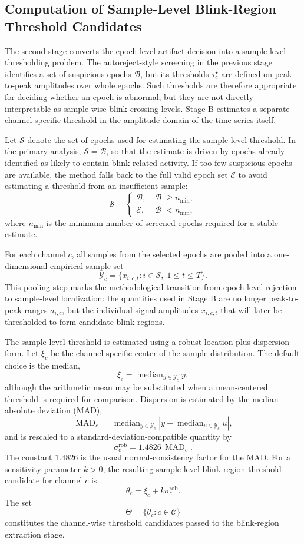 \subsection{Computation of Sample-Level Blink-Region Threshold Candidates}

The second stage converts the epoch-level artifact decision into a
sample-level thresholding problem. The autoreject-style screening in the
previous stage identifies a set of suspicious epochs \(\mathcal{B}\), but its
thresholds \(\tau_c^\star\) are defined on peak-to-peak amplitudes over whole
epochs. Such thresholds are therefore appropriate for deciding whether an epoch
is abnormal, but they are not directly interpretable as sample-wise blink
crossing levels. Stage B estimates a separate channel-specific threshold in
the amplitude domain of the time series itself.

Let \(\mathcal{S}\) denote the set of epochs used for estimating the
sample-level threshold. In the primary analysis,
\(\mathcal{S}=\mathcal{B}\), so that the estimate is driven by epochs already
identified as likely to contain blink-related activity. If too few suspicious
epochs are available, the method falls back to the full valid epoch set
\(\mathcal{E}\) to avoid estimating a threshold from an insufficient sample:
\[
\mathcal{S}
=
\begin{cases}
\mathcal{B}, & |\mathcal{B}| \geq n_{\min},\\
\mathcal{E}, & |\mathcal{B}| < n_{\min},
\end{cases}
\]
where \(n_{\min}\) is the minimum number of screened epochs required for a
stable estimate.

For each channel \(c\), all samples from the selected epochs are pooled into a
one-dimensional empirical sample set
\[
\mathcal{Y}_c
= \{x_{i,c,t}: i \in \mathcal{S},\; 1 \leq t \leq T\}.
\]
This pooling step marks the methodological transition from epoch-level
rejection to sample-level localization: the quantities used in Stage B are no
longer peak-to-peak ranges \(a_{i,c}\), but the individual signal amplitudes
\(x_{i,c,t}\) that will later be thresholded to form candidate blink regions.

The sample-level threshold is estimated using a robust location-plus-dispersion
form. Let \(\xi_c\) be the channel-specific center of the sample distribution.
The default choice is the median,
\[
\xi_c = \operatorname{median}_{y \in \mathcal{Y}_c} y,
\]
although the arithmetic mean may be substituted when a mean-centered threshold
is required for comparison. Dispersion is estimated by the median absolute
deviation (MAD),
\[
\operatorname{MAD}_c
= \operatorname{median}_{y \in \mathcal{Y}_c}
\left|y-\operatorname{median}_{u \in \mathcal{Y}_c}u\right|,
\]
and is rescaled to a standard-deviation-compatible quantity by
\[
\sigma^{\mathrm{rob}}_c = 1.4826\,\operatorname{MAD}_c .
\]
The constant \(1.4826\) is the usual normal-consistency factor for the MAD. For
a sensitivity parameter \(k>0\), the resulting sample-level blink-region
threshold candidate for channel \(c\) is
\[
\theta_c = \xi_c + k\sigma^{\mathrm{rob}}_c .
\]
The set
\[
\Theta = \{\theta_c: c \in \mathcal{C}\}
\]
constitutes the channel-wise threshold candidates passed to the blink-region
extraction stage.

